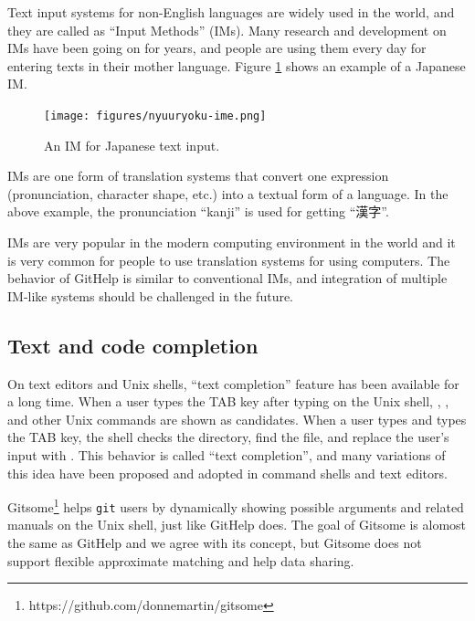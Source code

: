\documentclass{sigchi}
\def\GH{\textsf{GitHelp}}
\def\GIT{\texttt{git}}
\begin{document}
Text input systems for non-English languages are widely used
in the world,
and they are called as ``Input Methods'' (IMs).
%
Many research and development on IMs have been going on for years, and
people are using them every day for entering texts in their mother language.
Figure \ref{gyaim} shows an example of a Japanese IM.

\begin{figure}[H]
  \centerline{\texttt{[image: figures/nyuuryoku-ime.png]}}
  \caption{An IM for Japanese text input.}
  \label{gyaim}
\end{figure}

IMs are one form of translation systems that convert one
expression (pronunciation, character shape, etc.)
into a textual form of a language.
In the above example, the pronunciation ``kanji''
is used for getting ``漢字''.

IMs are very popular in the modern computing environment in the world
and it is very common for people to 
use translation systems for using computers.
%
The behavior of {\GH} is similar to conventional IMs, and
integration of multiple IM-like systems should be challenged in the future.

\subsection{Text and code completion}

On text editors and Unix shells,
``text completion'' feature has been available for a long time.
%
When a user types the TAB key after typing  on the Unix shell,
, , and other Unix commands are shown as candidates.
When a user types  and types the TAB key,
the shell checks the directory, find the  file, and
replace the user's input with .
This behavior is called ``text completion'', and many variations of
this idea have been proposed and adopted in command shells and text editors.


Gitsome\footnote{\textsf{https:{\slash}{\slash}github.com{\slash}donnemartin{\slash}gitsome}}
helps {\GIT} users by
dynamically showing possible arguments and related manuals on the Unix shell,
just like {\GH} does.
The goal of Gitsome is alomost the same as {\GH} and we agree with its concept,
but Gitsome does not support flexible approximate matching and
help data sharing.
\end{document}
